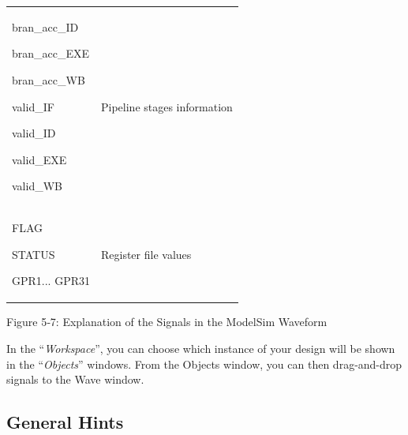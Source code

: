\documentclass[
]{article}
\begin{document}
\begin{longtable}[]{@{}ll@{}}
\begin{minipage}[t]{0.47\columnwidth}
bran\_acc\_ID

bran\_acc\_EXE

bran\_acc\_WB

valid\_IF

valid\_ID

valid\_EXE

valid\_WB\strut
\end{minipage} & \begin{minipage}[t]{0.47\columnwidth}\raggedright
Pipeline stages information\strut
\end{minipage}\tabularnewline
\begin{minipage}[t]{0.47\columnwidth}\raggedright
FLAG

STATUS

GPR1... GPR31\strut
\end{minipage} & \begin{minipage}[t]{0.47\columnwidth}\raggedright
Register file values\strut
\end{minipage}\tabularnewline
\bottomrule
\end{longtable}

Figure 5‑7: Explanation of the Signals in the ModelSim Waveform

In the ``\emph{Workspace}'', you can choose which instance of your
design will be shown in the ``\emph{Objects}'' windows. From the Objects
window, you can then drag-and-drop signals to the Wave window.

\hypertarget{general-hints}{%
\subsection{General Hints}\label{general-hints}}
\end{document}
